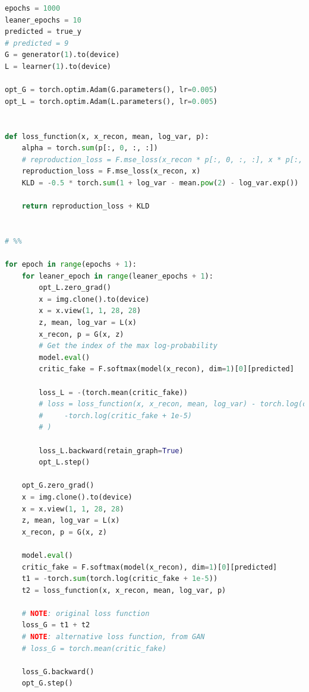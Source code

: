 \documentclass[12pt]{article}
\begin{document}
\begin{lstlisting}[language=Python, caption= GAN and VAE loss function]
epochs = 1000
leaner_epochs = 10
predicted = true_y
# predicted = 9
G = generator(1).to(device)
L = learner(1).to(device)

opt_G = torch.optim.Adam(G.parameters(), lr=0.005)
opt_L = torch.optim.Adam(L.parameters(), lr=0.005)


def loss_function(x, x_recon, mean, log_var, p):
    alpha = torch.sum(p[:, 0, :, :])
    # reproduction_loss = F.mse_loss(x_recon * p[:, 0, :, :], x * p[:, 0, :, :])
    reproduction_loss = F.mse_loss(x_recon, x)
    KLD = -0.5 * torch.sum(1 + log_var - mean.pow(2) - log_var.exp())

    return reproduction_loss + KLD


# %%

for epoch in range(epochs + 1):
    for leaner_epoch in range(leaner_epochs + 1):
        opt_L.zero_grad()
        x = img.clone().to(device)
        x = x.view(1, 1, 28, 28)
        z, mean, log_var = L(x)
        x_recon, p = G(x, z)
        # Get the index of the max log-probability
        model.eval()
        critic_fake = F.softmax(model(x_recon), dim=1)[0][predicted]

        loss_L = -(torch.mean(critic_fake))
        # loss = loss_function(x, x_recon, mean, log_var) - torch.log(critic_real + 1e-5) * (
        #     -torch.log(critic_fake + 1e-5)
        # )

        loss_L.backward(retain_graph=True)
        opt_L.step()

    opt_G.zero_grad()
    x = img.clone().to(device)
    x = x.view(1, 1, 28, 28)
    z, mean, log_var = L(x)
    x_recon, p = G(x, z)

    model.eval()
    critic_fake = F.softmax(model(x_recon), dim=1)[0][predicted]
    t1 = -torch.sum(torch.log(critic_fake + 1e-5))
    t2 = loss_function(x, x_recon, mean, log_var, p)

    # NOTE: original loss function
    loss_G = t1 + t2
    # NOTE: alternative loss function, from GAN
    # loss_G = torch.mean(critic_fake)

    loss_G.backward()
    opt_G.step()
\end{lstlisting}
\end{document}
